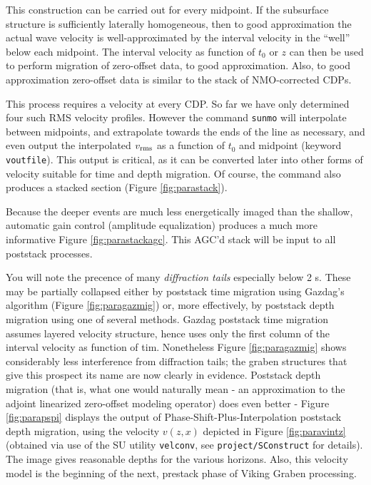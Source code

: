 This construction can be carried out for every midpoint. If the subsurface structure is sufficiently laterally homogeneous, then to good approximation the actual wave velocity is well-approximated by the interval velocity in the ``well'' below each midpoint. The interval velocity as function of $t_0$ or $z$ can then be used to perform migration of zero-offset data, to good approximation. Also, to good approximation zero-offset data is similar to the stack of NMO-corrected CDPs.

This process requires a velocity at every CDP. So far we have only determined four such RMS velocity profiles. However the command {\tt sunmo} will interpolate between 
midpoints, and extrapolate towards the ends of the line as necessary, and even output the interpolated $v_{\rm rms}$ as a function of $t_0$ and midpoint (keyword {\tt voutfile}). This output is critical, as it can be converted later into other forms of velocity suitable for time and depth migration. Of course, the command also produces a stacked section (Figure \ref{fig:parastack}). 

Because the deeper events are much less energetically imaged than the shallow, automatic gain control (amplitude equalization) produces a much more informative Figure \ref{fig:parastackagc}. This AGC'd stack will be input to all poststack processes.

You will note the precence of many {\em diffraction tails} especially below 2 s. These may be partially collapsed either by poststack time migration using Gazdag's algorithm (Figure \ref{fig:paragazmig}) or, more effectively, by poststack depth migration using one of several methods. Gazdag poststack time migration assumes layered velocity structure, hence uses only the first column of the interval velocity as function of tim. Nonetheless Figure \ref{fig:paragazmig} shows considerably less interference from diffraction tails; the graben structures that give this prospect its name are now clearly in evidence. Poststack depth migration (that is, what one would naturally mean - an approximation to the adjoint linearized zero-offset modeling operator) does even better - Figure \ref{fig:parapspi} displays the output of Phase-Shift-Plus-Interpolation poststack depth migration, using the velocity $v(z,x)$ depicted in Figure \ref{fig:paravintz} (obtained via use of the SU utility {\tt velconv}, see {\tt project/SConstruct} for details). The image gives reasonable depths for the various horizons. Also, this velocity model is the beginning of the next, prestack phase of Viking Graben processing.


